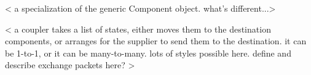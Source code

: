 %


< a specialization of the generic Component object.  what's different...>

< a coupler takes a list of states, either moves them to the
destination components, or arranges for the supplier to send
them to the destination.  it can be 1-to-1, or it can be
many-to-many.  lots of styles possible here.  define and
describe exchange packets here? >
